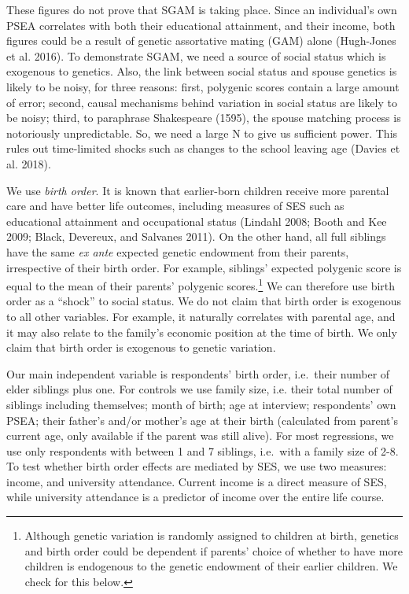\documentclass[
]{article}
\begin{document}
These figures do not prove that SGAM is taking place. Since an
individual's own PSEA correlates with both their educational attainment,
and their income, both figures could be a result of genetic assortative
mating (GAM) alone (Hugh-Jones et al. 2016). To demonstrate SGAM, we need
a source of social status which is exogenous to genetics. Also, the link
between social status and spouse genetics is likely to be noisy, for
three reasons: first, polygenic scores contain a large amount of error;
second, causal mechanisms behind variation in social status are likely
to be noisy; third, to paraphrase Shakespeare (1595), the spouse
matching process is notoriously unpredictable. So, we need a large N to
give us sufficient power. This rules out time-limited shocks such as
changes to the school leaving age (Davies et al. 2018).

We use \emph{birth order}. It is known that earlier-born children receive
more parental care and have better life outcomes, including measures of
SES such as educational attainment and occupational status
(Lindahl 2008; Booth and Kee 2009; Black, Devereux, and Salvanes 2011). On the other hand,
all full siblings have the same \emph{ex ante} expected genetic endowment
from their parents, irrespective of their birth order. For example,
siblings' expected polygenic score is equal to the mean of their
parents' polygenic scores.\footnote{Although genetic variation is randomly assigned to children at
  birth, genetics and birth order could be dependent if parents'
  choice of whether to have more children is endogenous to the genetic
  endowment of their earlier children. We check for this below.} We can therefore use birth order as a
``shock'' to social status. We do not claim that birth order is exogenous
to all other variables. For example, it naturally correlates with
parental age, and it may also relate to the family's economic position
at the time of birth. We only claim that birth order is exogenous to
genetic variation.

Our main independent variable is respondents' birth order, i.e.~their
number of elder siblings plus one. For controls we use family size, i.e.
their total number of siblings including themselves; month of birth; age
at interview; respondents' own PSEA; their father's and/or mother's age
at their birth (calculated from parent's current age, only available if
the parent was still alive). For most regressions, we use only
respondents with between 1 and 7 siblings, i.e.~with a family size of
2-8. To test whether birth order effects are mediated by SES, we use two
measures: income, and university attendance. Current income is a direct
measure of SES, while university attendance is a predictor of income
over the entire life course.
\end{document}
